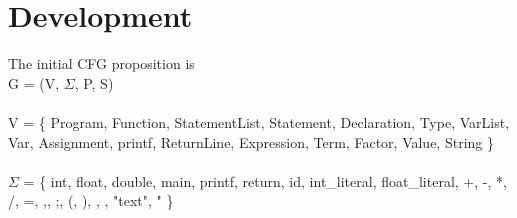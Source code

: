 \documentclass[letterpaper,12pt,oneside]{article}
\begin{document}

\section{Development}

The initial CFG proposition is\\
G = (V, $\Sigma$, P, S)\\
\\
V = \{
Program, Function, StatementList, Statement, Declaration, Type, VarList, Var, Assignment, printf, ReturnLine, Expression, Term, Factor, Value, String
\}
\\\\
 $\Sigma$ =  \{
 int, float, double, main, printf, return, id, int\_literal, 
 float\_literal, +, -, *, /, =, ,, ;, (, ), {, }, "text", "%
    \} \\\\
\end{document}
